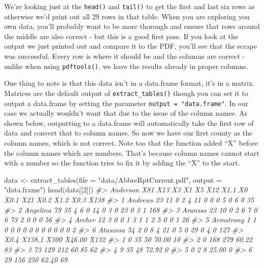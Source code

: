 \documentclass[
]{krantz}
\makeatletter
\newenvironment{Shaded}{\begin{snugshade}}{\end{snugshade}}
\newcommand{\AttributeTok}[1]{\textcolor[rgb]{0.61,0.61,0.61}{#1}}
\newcommand{\CommentTok}[1]{\textcolor[rgb]{0.37,0.37,0.37}{\textit{#1}}}
\newcommand{\DecValTok}[1]{\textcolor[rgb]{0.06,0.06,0.06}{#1}}
\newcommand{\FunctionTok}[1]{\textcolor[rgb]{0,0,0}{#1}}
\newcommand{\NormalTok}[1]{#1}
\newcommand{\OtherTok}[1]{\textcolor[rgb]{0.37,0.37,0.37}{#1}}
\newcommand{\StringTok}[1]{\textcolor[rgb]{0.5,0.5,0.5}{#1}}
\newenvironment{kframe}{%
\medskip{}
\setlength{\fboxsep}{.8em}
 \def\at@end@of@kframe{}%
 \ifinner\ifhmode%
  \def\at@end@of@kframe{\end{minipage}}%
  \begin{minipage}{\columnwidth}%
 \fi\fi%
 \def\FrameCommand##1{\hskip\@totalleftmargin \hskip-\fboxsep
 \colorbox{shadecolor}{##1}\hskip-\fboxsep
     \hskip-\linewidth \hskip-\@totalleftmargin \hskip\columnwidth}%
 \MakeFramed {\advance\hsize-\width
   \@totalleftmargin\z@ \linewidth\hsize
   \@setminipage}}%
 {\par\unskip\endMakeFramed%
 \at@end@of@kframe}
\renewenvironment{Shaded}{\begin{kframe}}{\end{kframe}}
\makeatother
\begin{document}
We're looking just at the \texttt{head()} and \texttt{tail()} to get the first and last six rows as otherwise we'd print out all 29 rows in that table. When you are exploring you own data, you'll probably want to be more thorough and ensure that rows around the middle are also correct - but this is a good first pass. If you look at the output we just printed out and compare it to the PDF, you'll see that the scrape was successful. Every row is where it should be and the columns are correct - unlike when using \texttt{pdftools()}, we have the results already in proper columns.

One thing to note is that this data isn't in a data.frame format, it's in a matrix. Matrices are the default output of \texttt{extract\_tables()} though you can set it to output a data.frame by setting the parameter \texttt{output\ =\ "data.frame"}. In our case we actually wouldn't want that due to the issue of the column names. As shown below, outputting to a data.frame will automatically take the first row of data and convert that to column names. So now we have our first county as the column names, which is not correct. Note too that the function added ``X'' before the column names which are numbers. That's because column names cannot start with a number so the function tries to fix it by adding the ``X'' to the start.

\begin{Shaded}
\begin{Highlighting}[]
\NormalTok{data }\OtherTok{\textless{}{-}} \FunctionTok{extract\_tables}\NormalTok{(}\AttributeTok{file =} \StringTok{"data/AbbreRptCurrent.pdf"}\NormalTok{, }\AttributeTok{output =} \StringTok{"data.frame"}\NormalTok{)}
\FunctionTok{head}\NormalTok{(data[[}\DecValTok{2}\NormalTok{]])}
\CommentTok{\#\textgreater{}    Anderson X81 X13 X3 X1 X5 X12 X1.1 X0 X0.1 X21 X0.2 X1.2 X0.3 X138}
\CommentTok{\#\textgreater{} 1   Andrews  23  11  0  2  4  11    0  0    0   5    0    6    0   35}
\CommentTok{\#\textgreater{} 2  Angelina  79  35  4  6  0  14    0  3    0  23    0    3    1  168}
\CommentTok{\#\textgreater{} 3   Aransas  23  10  0  2  6   7    0  6   73   2    0    0    0   56}
\CommentTok{\#\textgreater{} 4    Archer  12   3  0  0  1   3    1  1    2   5    0    0    1   26}
\CommentTok{\#\textgreater{} 5 Armstrong   1   1  0  0  0   0    0  0    0   0    0    0    0    2}
\CommentTok{\#\textgreater{} 6  Atascosa  54   2  0  8  4  21    0  5    0  29    0    4    0  127}
\CommentTok{\#\textgreater{}   X0.4 X138.1 X300 X46.00 X132}
\CommentTok{\#\textgreater{} 1    0     35   50  70.00   10}
\CommentTok{\#\textgreater{} 2    0    168  279  60.22   83}
\CommentTok{\#\textgreater{} 3   73    129  212  60.85   62}
\CommentTok{\#\textgreater{} 4    9     35   48  72.92    0}
\CommentTok{\#\textgreater{} 5    0      2    8  25.00    0}
\CommentTok{\#\textgreater{} 6   29    156  250  62.40   69}
\end{Highlighting}
\end{Shaded}
\end{document}
